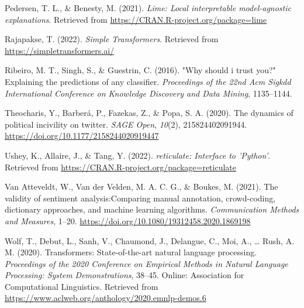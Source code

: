 \documentclass[
  english,
  man,floatsintext]{apa7}
\newlength{\cslhangindent}
\newenvironment{cslreferences}%
  {\setlength{\parindent}{0pt}%
  \everypar{\setlength{\hangindent}{\cslhangindent}}\ignorespaces}%
  {\par}
\begin{document}
\begin{cslreferences}
\leavevmode\hypertarget{ref-lime}{}%
Pedersen, T. L., \& Benesty, M. (2021). \emph{Lime: Local interpretable model-agnostic explanations}. Retrieved from \url{https://CRAN.R-project.org/package=lime}

\leavevmode\hypertarget{ref-simpletransformers}{}%
Rajapakse, T. (2022). \emph{Simple Transformers}. Retrieved from \url{https://simpletransformers.ai/}

\leavevmode\hypertarget{ref-ribeiro2016should}{}%
Ribeiro, M. T., Singh, S., \& Guestrin, C. (2016). "Why should i trust you?" Explaining the predictions of any classifier. \emph{Proceedings of the 22nd Acm Sigkdd International Conference on Knowledge Discovery and Data Mining}, 1135--1144.

\leavevmode\hypertarget{ref-theocharis:2020:DPI}{}%
Theocharis, Y., Barberá, P., Fazekas, Z., \& Popa, S. A. (2020). The dynamics of political incivility on twitter. \emph{SAGE Open}, \emph{10}(2), 215824402091944. \url{https://doi.org/10.1177/2158244020919447}

\leavevmode\hypertarget{ref-reticulate}{}%
Ushey, K., Allaire, J., \& Tang, Y. (2022). \emph{reticulate: Interface to 'Python'}. Retrieved from \url{https://CRAN.R-project.org/package=reticulate}

\leavevmode\hypertarget{ref-atteveldt:2021:VSA}{}%
Van Atteveldt, W., Van der Velden, M. A. C. G., \& Boukes, M. (2021). The validity of sentiment analysis:Comparing manual annotation, crowd-coding, dictionary approaches, and machine learning algorithms. \emph{Communication Methods and Measures}, 1--20. \url{https://doi.org/10.1080/19312458.2020.1869198}

\leavevmode\hypertarget{ref-wolf-etal-2020-transformers}{}%
Wolf, T., Debut, L., Sanh, V., Chaumond, J., Delangue, C., Moi, A., \ldots{} Rush, A. M. (2020). Transformers: State-of-the-art natural language processing. \emph{Proceedings of the 2020 Conference on Empirical Methods in Natural Language Processing: System Demonstrations}, 38--45. Online: Association for Computational Linguistics. Retrieved from \url{https://www.aclweb.org/anthology/2020.emnlp-demos.6}
\end{cslreferences}

\endgroup
\end{document}
